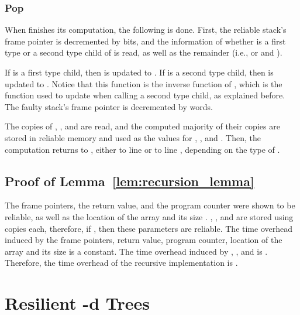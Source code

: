 \documentclass{llncs}
\begin{document}
\subsubsection{Pop}

When  finishes its computation, the following is done. First, the reliable stack's frame pointer is decremented by  bits, and the information of whether  is a first type or a second type child of  is read, as well as the remainder (i.e.,  or  and ).

If  is a first type child, then  is updated to . If  is a second type child, then  is updated to . Notice that this function is the inverse function of , which is the function used to update  when calling a second type child, as explained before. The faulty stack's frame pointer is decremented by  words.

The  copies of , , and  are read, and the computed majority of their copies are stored in reliable memory and used as the values for , , and . Then, the computation returns to , either to line  or to line , depending on the type of .













\subsection{Proof of Lemma~\ref{lem:recursion_lemma}}

\begin{pf}
The frame pointers, the return value, and the program counter were shown to be reliable, as well as the location of the array  and its size . , , and  are stored using  copies each, therefore, if , then these parameters are reliable. The time overhead induced by the frame pointers, return value, program counter, location of the array  and its size  is a constant. The time overhead induced by , , and  is . Therefore, the time overhead of the recursive implementation is .
\end{pf}











\section{Resilient -d Trees}
\label{sec:resilient_kd_trees}
\end{document}

